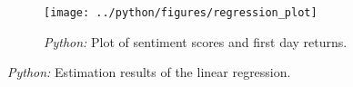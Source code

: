 \documentclass[11pt, a4paper, leqno]{article}
\begin{document}
\begin{figure}[H]

    \centering
    \texttt{[image: ../python/figures/regression\_plot]}

    \caption{\emph{Python:} Plot of sentiment scores and first day returns.}
    \label{fig:python-predictions}

\end{figure}

\begin{table}[H]
    
    \caption{\label{tab:python-summary}\emph{Python:} Estimation results of the
        linear regression.}
\end{table}






\printbibliography
{}



\end{document}
